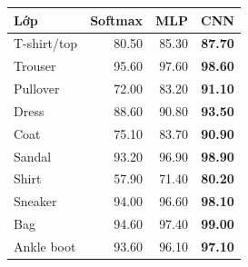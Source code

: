 \begin{tabular}{lrrr}
\toprule
Lớp & Softmax & MLP & CNN \\
\midrule
T-shirt/top & 80.50 & 85.30 & \textbf{87.70} \\
Trouser & 95.60 & 97.60 & \textbf{98.60} \\
Pullover & 72.00 & 83.20 & \textbf{91.10} \\
Dress & 88.60 & 90.80 & \textbf{93.50} \\
Coat & 75.10 & 83.70 & \textbf{90.90} \\
Sandal & 93.20 & 96.90 & \textbf{98.90} \\
Shirt & 57.90 & 71.40 & \textbf{80.20} \\
Sneaker & 94.00 & 96.60 & \textbf{98.10} \\
Bag & 94.60 & 97.40 & \textbf{99.00} \\
Ankle boot & 93.60 & 96.10 & \textbf{97.10} \\
\bottomrule
\end{tabular}
